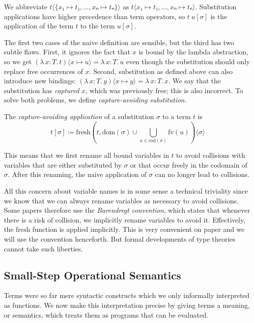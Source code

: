 \documentclass{scrartcl}
\theoremstyle{definition}
\newcommand{\fv}{\mathrm{fv}}
\newcommand{\dom}{\mathrm{dom}}
\newcommand{\cod}{\mathrm{cod}}
\newcommand{\fresh}{\mathrm{fresh}}
\newcommand{\Lam}[2]{λ\,#1.\, #2}
\begin{document}
We abbreviate $t⟨\{x₁ ↦ t₁, \dots, xₙ ↦ tₙ\}⟩$ as $t⟨x₁ ↦ t₁, \dots, xₙ ↦ tₙ⟩$.
Substitution applications have higher precedence than term operators, so $t~u[σ]$ is the application of the term $t$ to the term $u[σ]$.

The first two cases of the naive definition are sensible, but the third has two subtle flaws.
First, it ignores the fact that $x$ is bound by the lambda abstraction, so we get $(\Lam{x : T}{t})⟨x ↦ u⟩ = \Lam{x : T}{u}$ even though the substitution should only replace free occurrences of $x$.
Second, substitution as defined above can also introduce new bindings: $(\Lam{x : T}{y})⟨x ↦ y⟩ = \Lam{x : T}{x}$.
We say that the substitution has \emph{captured} $x$, which was previously free; this is also incorrect.
To solve both problems, we define \emph{capture-avoiding substitution}.

\begin{definition}
  The \emph{capture-avoiding application} of a substitution $σ$ to a term $t$ is
  \[
    t[σ] ≔ \fresh(t, \dom(σ) ∪ \bigcup_{u ∈ \cod(σ)} \fv(u))⟨σ⟩
  \]
\end{definition}

This means that we first rename all bound variables in $t$ to avoid collisions with variables that are either substituted by $σ$ or that occur freely in the codomain of $σ$.
After this renaming, the naive application of $σ$ can no longer lead to collisions.

All this concern about variable names is in some sense a technical triviality since we know that we can always rename variables as necessary to avoid collisions.
Some papers therefore use the \emph{Barendregt convention}, which states that whenever there is a risk of collision, we implicitly rename variables to avoid it.
Effectively, the $\fresh$ function is applied implicitly.
This is very convenient on paper and we will use the convention henceforth.
But formal developments of type theories cannot take such liberties.

\subsection{Small-Step Operational Semantics}

Terms were so far mere syntactic constructs which we only informally interpreted as functions.
We now make this interpretation precise by giving terms a meaning, or semantics, which treats them as programs that can be evaluated.
\end{document}
